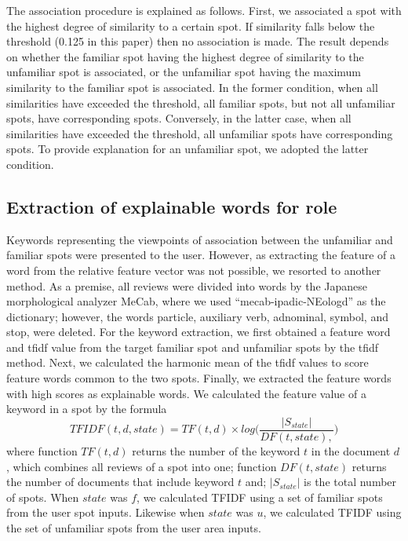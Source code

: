 \documentclass[journal]{IAENGtran}
\begin{document}
   The association procedure is explained as follows. First, we associated a spot with the highest degree of similarity to a certain spot. If similarity falls below the threshold (0.125 in this paper) then no association is made. The result depends on whether the familiar spot having the highest degree of similarity to the unfamiliar spot is associated, or the unfamiliar spot having the maximum similarity to the familiar spot is associated. In the former condition, when all similarities have exceeded the threshold, all familiar spots, but not all unfamiliar spots, have corresponding spots. Conversely, in the latter case, when all similarities have exceeded the threshold, all unfamiliar spots have corresponding spots. To provide explanation for an unfamiliar spot, we adopted the latter condition.

\subsection{Extraction of explainable words for role}
\label{subsec:Extraction of explainable words for role}
   Keywords representing the viewpoints of association between the unfamiliar and familiar spots were presented to the user. However, as extracting the feature of a word from the relative feature vector was not possible, we resorted to another method. As a premise, all reviews were divided into words by the Japanese morphological analyzer MeCab, where we used ``mecab-ipadic-NEologd'' as the dictionary; however, the words particle, auxiliary verb, adnominal, symbol, and stop, were deleted. For the keyword extraction, we first obtained a feature word and tfidf value from the target familiar spot and unfamiliar spots by the tfidf method. Next, we calculated the harmonic mean of the tfidf values to score feature words common to the two spots. Finally, we extracted the feature words with high scores as explainable words.
   We calculated the feature value of a keyword in a spot by the formula
\begin{equation}
  TFIDF(t,d,state) = TF(t,d) \times log\Biggr(\frac{|S_{state}|}{DF(t,state),}\Biggr)
  \label{math:TFIDF}
\end{equation}
where function $TF(t,d)$ returns the number of the keyword $t$ in the document $d$, which combines all reviews of a spot into one; function $DF(t,state)$ returns the number of documents that include keyword $t$ and; $|S_{state}|$ is the total number of spots.
When $state$ was $f$, we calculated TFIDF using a set of familiar spots from the user spot inputs. Likewise when $state$ was $u$, we calculated TFIDF using the set of unfamiliar spots from the user area inputs.
\end{document}
